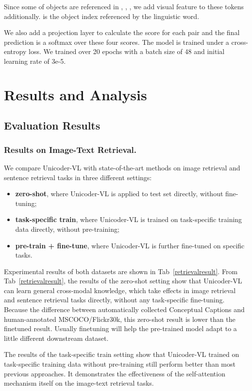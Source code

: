 \documentclass[letterpaper]{article} \usepackage{aaai20}  \usepackage{times}  \usepackage{helvet} \usepackage{courier}  \usepackage[hyphens]{url}  \usepackage{graphicx} \urlstyle{rm} \def\UrlFont{\rm}  \usepackage{graphicx}  \frenchspacing  \setlength{\pdfpagewidth}{8.5in}  \setlength{\pdfpageheight}{11in}  \usepackage{amssymb}
\begin{document}
Since some of objects are referenced in , , , we add visual feature  to these tokens additionally.  is the object index referenced by the linguistic word.

We also add a projection layer to calculate the score for each pair and the final prediction is a softmax over these four scores. The model is trained under a cross-entropy loss. We trained over 20 epochs with a batch size of 48 and initial learning rate of 3e-5.

\section{Results and Analysis}

\subsection{Evaluation Results}

\subsubsection{Results on Image-Text Retrieval.}
We compare Unicoder-VL with state-of-the-art methods on image retrieval and sentence retrieval tasks in three different settings:
\begin{itemize}
    \item \textbf{zero-shot}, where Unicoder-VL is applied to test set directly, without fine-tuning;
    \item \textbf{task-specific train}, where Unicoder-VL is trained on task-specific training data directly, without pre-training;
    \item \textbf{pre-train + fine-tune}, where Unicoder-VL is further fine-tuned on specific tasks.
\end{itemize}

Experimental results of both datasets are shown in Tab~\ref{retrievalresult}.  
From Tab~\ref{retrievalresult}, the results of the zero-shot setting show that Unicoder-VL can learn general cross-modal knowledge, which take effects in image retrieval and sentence retrieval tasks directly, without any task-specific fine-tuning. Because the difference between automatically collected Conceptual Captions and human-annotated MSCOCO/Flickr30k, this zero-shot result is lower than the finetuned result. Usually finetuning will help the pre-trained model adapt to a little different downstream dataset.

The results of the task-specific train setting show that Unicoder-VL trained on task-specific training data without pre-training still perform better than most previous approaches. It demonstrates the effectiveness of the self-attention mechanism itself on the image-text retrieval tasks.
\end{document}
